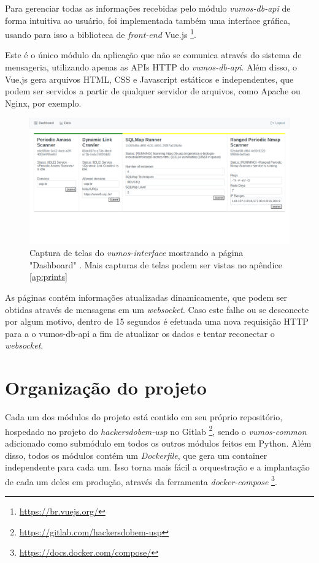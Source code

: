     Para gerenciar todas as informações recebidas pelo módulo \textit{vumos-db-api} de forma intuitiva ao usuário, foi implementada também uma interface gráfica, usando para isso a biblioteca de \textit{front-end} Vue.js \footnote{\url{https://br.vuejs.org/}}. 
    
    Este é o único módulo da aplicação que não se comunica através do sistema de mensageria, utilizando apenas as APIs HTTP do \textit{vumos-db-api}. Além disso, o Vue.js gera arquivos HTML, CSS e Javascript estáticos e independentes, que podem ser servidos a partir de qualquer servidor de arquivos, como Apache ou Nginx, por exemplo. 
    
    \begin{figure}[H]
        \includegraphics[scale=0.32]{figuras/vumos-interface-modules.png}
        \caption{Captura de telas do \textit{vumos-interface} mostrando a página "Dashboard" \label{fig:vumos-interface-modules}. Mais capturas de telas podem ser vistas no apêndice  \ref{ap:prints}}
    \end{figure}
    
    As páginas contém informações atualizadas dinamicamente, que podem ser obtidas através de mensagens em um \textit{websocket}. Caso este falhe ou se desconecte por algum motivo, dentro de 15 segundos é efetuada uma nova requisição HTTP para a o vumos-db-api a fim de atualizar os dados e tentar reconectar o \textit{websocket}.
    

\section{Organização do projeto}
    
    Cada um dos módulos do projeto está contido em seu próprio repositório, hospedado no projeto do \textit{hackersdobem-usp} no Gitlab  \footnote{\url{https://gitlab.com/hackersdobem-usp}}, sendo o \textit{vumos-common} adicionado como submódulo em todos os outros módulos feitos em Python. Além disso, todos os módulos contém um \textit{Dockerfile}, que gera um container independente para cada um. Isso torna mais fácil a orquestração e a implantação de cada um deles em produção, através da ferramenta \textit{docker-compose} \footnote{\url{https://docs.docker.com/compose/}}.
    
